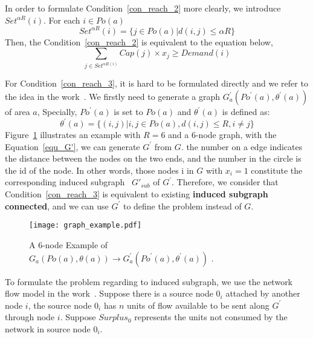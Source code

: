 In order to formulate Condition~\ref{con_reach_2} more clearly,
we introduce $Set^{\alpha{R}}(i)$.
For each $i \in Po(a)$
\begin{equation}
Set^{\alpha{R}}(i)=\{j \in Po(a) | d(i,j) \leqslant \alpha{R} \}
\end{equation}
Then, the Condition~\ref{con_reach_2} is equivalent to the equation below,
\begin{equation}
\label{equ_condition_2}
\sum_{j \in Set^{\alpha{R}(i)}} Cap(j) \times x_j \geqslant Demand(i)
\end{equation}

For Condition~\ref{con_reach_3},
it is hard to be formulated directly and we refer to the idea in the work~\cite{lam2013electric}.
We firstly need to generate a graph $G_{a}^{'}({Po}^{'}(a),{\theta}^{'}(a))$ of area $a$,
Specially, ${Po}^{'}(a)$ is set to $Po(a)$ and ${\theta}^{'}(a)$ is defined as:
\begin{equation}
\label{equ_G'}
{\theta}^{'}(a) =\{(i,j) | i,j \in Po(a), d(i,j) \leqslant R, i \neq j \}
\end{equation}
Figure~\ref{fig_graph_example} illustrates an example with $R = 6$ and a 6-node graph,
with the Equation~\ref{equ_G'}, we can generate $G^{'}$ from $G$.
the number on a edge indicates the distance between the nodes on the two ends,
and the number in the circle is the id of the node.
In other words, those nodes i in $G$ with $x_i = 1$ constitute the corresponding induced subgraph~\cite{Induced_Subgraph} $G{'}_{sub}$ of $G^{'}$.
Therefore, we consider that Condition~\ref{con_reach_3} is equivalent to existing \textbf{induced subgraph connected},
and we can use $G^{'}$ to define the problem instead of $G$.
\begin{figure}[!t]
\centering
\texttt{[image: graph\_example.pdf]}
\caption{A 6-node Example of $G_{a}(Po(a),\theta(a)) \rightarrow G_{a}^{'}({Po}^{'}(a),{\theta}^{'}(a))$ .}
\label{fig_graph_example}
\end{figure}

To formulate the problem regarding to induced subgraph, we use the network flow model in the work~\cite{conrad2012wildlife, lam2014electric}.
Suppose there is a source node $0_i$ attached by another node $i$,
the source node $0_i$ has $n$ units of flow available to be sent along $G^{'}$ through node $i$.
Suppose $Surplus_0$ represents the units not consumed by the network in source node $0_i$.

